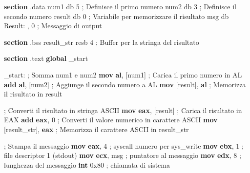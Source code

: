 \documentclass[
  letterpaper,
]{scrbook}
\newenvironment{Shaded}{\begin{snugshade}}{\end{snugshade}}
\newcommand{\BaseNTok}[1]{\textcolor[rgb]{0.68,0.00,0.00}{#1}}
\newcommand{\CommentTok}[1]{\textcolor[rgb]{0.37,0.37,0.37}{#1}}
\newcommand{\DataTypeTok}[1]{\textcolor[rgb]{0.68,0.00,0.00}{#1}}
\newcommand{\DecValTok}[1]{\textcolor[rgb]{0.68,0.00,0.00}{#1}}
\newcommand{\FunctionTok}[1]{\textcolor[rgb]{0.28,0.35,0.67}{#1}}
\newcommand{\KeywordTok}[1]{\textcolor[rgb]{0.00,0.23,0.31}{\textbf{#1}}}
\newcommand{\NormalTok}[1]{\textcolor[rgb]{0.00,0.23,0.31}{#1}}
\newcommand{\OperatorTok}[1]{\textcolor[rgb]{0.37,0.37,0.37}{#1}}
\newcommand{\StringTok}[1]{\textcolor[rgb]{0.13,0.47,0.30}{#1}}
\begin{document}
\begin{Shaded}
\begin{Highlighting}[]
\KeywordTok{section} \FunctionTok{.data}
\NormalTok{    num1 }\DataTypeTok{db} \DecValTok{5}           \CommentTok{; Definisce il primo numero}
\NormalTok{    num2 }\DataTypeTok{db} \DecValTok{3}           \CommentTok{; Definisce il secondo numero}
\NormalTok{    result }\DataTypeTok{db} \DecValTok{0}         \CommentTok{; Variabile per memorizzare il risultato}
\NormalTok{    msg }\DataTypeTok{db} \StringTok{\textquotesingle{}Result: \textquotesingle{}}\OperatorTok{,} \DecValTok{0} \CommentTok{; Messaggio di output}

\KeywordTok{section} \FunctionTok{.bss}
\NormalTok{    result\_str }\DataTypeTok{resb} \DecValTok{4}   \CommentTok{; Buffer per la stringa del risultato}

\KeywordTok{section} \FunctionTok{.text}
    \KeywordTok{global}\NormalTok{ \_start}

\FunctionTok{\_start:}
    \CommentTok{; Somma num1 e num2}
    \KeywordTok{mov} \KeywordTok{al}\OperatorTok{,} \OperatorTok{[}\NormalTok{num1}\OperatorTok{]}      \CommentTok{; Carica il primo numero in AL}
    \KeywordTok{add} \KeywordTok{al}\OperatorTok{,} \OperatorTok{[}\NormalTok{num2}\OperatorTok{]}      \CommentTok{; Aggiunge il secondo numero a AL}
    \KeywordTok{mov} \OperatorTok{[}\NormalTok{result}\OperatorTok{],} \KeywordTok{al}    \CommentTok{; Memorizza il risultato in result}

    \CommentTok{; Converti il risultato in stringa ASCII}
    \KeywordTok{mov} \KeywordTok{eax}\OperatorTok{,} \OperatorTok{[}\NormalTok{result}\OperatorTok{]}   \CommentTok{; Carica il risultato in EAX}
    \KeywordTok{add} \KeywordTok{eax}\OperatorTok{,} \StringTok{\textquotesingle{}0\textquotesingle{}}        \CommentTok{; Converti il valore numerico in carattere ASCII}
    \KeywordTok{mov} \OperatorTok{[}\NormalTok{result\_str}\OperatorTok{],} \KeywordTok{eax} \CommentTok{; Memorizza il carattere ASCII in result\_str}

    \CommentTok{; Stampa il messaggio}
    \KeywordTok{mov} \KeywordTok{eax}\OperatorTok{,} \DecValTok{4}          \CommentTok{; syscall numero per sys\_write}
    \KeywordTok{mov} \KeywordTok{ebx}\OperatorTok{,} \DecValTok{1}          \CommentTok{; file descriptor 1 (stdout)}
    \KeywordTok{mov} \KeywordTok{ecx}\OperatorTok{,}\NormalTok{ msg        }\CommentTok{; puntatore al messaggio}
    \KeywordTok{mov} \KeywordTok{edx}\OperatorTok{,} \DecValTok{8}          \CommentTok{; lunghezza del messaggio}
    \KeywordTok{int} \BaseNTok{0x80}            \CommentTok{; chiamata di sistema}


\end{Highlighting}
\end{Shaded}
\end{document}
